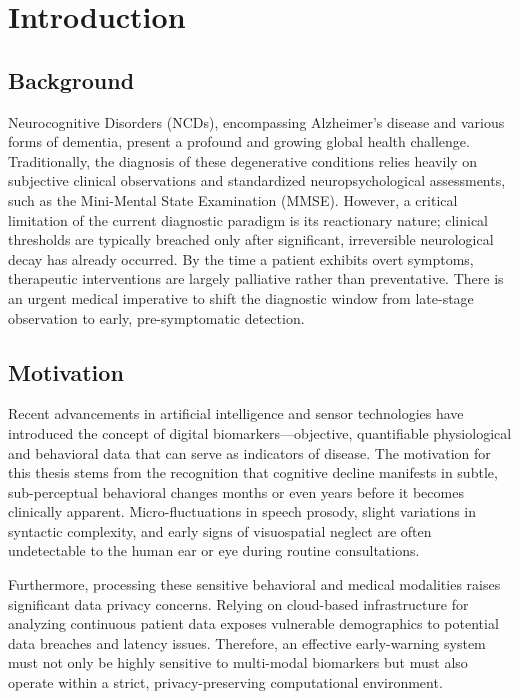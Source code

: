 \documentclass[BTech]{iitmdiss}
\begin{document}
\chapter{Introduction}
\label{chap:intro}

\section{Background}
Neurocognitive Disorders (NCDs), encompassing Alzheimer's disease and various forms of dementia, present a profound and growing global health challenge. Traditionally, the diagnosis of these degenerative conditions relies heavily on subjective clinical observations and standardized neuropsychological assessments, such as the Mini-Mental State Examination (MMSE). However, a critical limitation of the current diagnostic paradigm is its reactionary nature; clinical thresholds are typically breached only after significant, irreversible neurological decay has already occurred. By the time a patient exhibits overt symptoms, therapeutic interventions are largely palliative rather than preventative. There is an urgent medical imperative to shift the diagnostic window from late-stage observation to early, pre-symptomatic detection.

\section{Motivation}
Recent advancements in artificial intelligence and sensor technologies have introduced the concept of digital biomarkers—objective, quantifiable physiological and behavioral data that can serve as indicators of disease. The motivation for this thesis stems from the recognition that cognitive decline manifests in subtle, sub-perceptual behavioral changes months or even years before it becomes clinically apparent. Micro-fluctuations in speech prosody, slight variations in syntactic complexity, and early signs of visuospatial neglect are often undetectable to the human ear or eye during routine consultations. 

Furthermore, processing these sensitive behavioral and medical modalities raises significant data privacy concerns. Relying on cloud-based infrastructure for analyzing continuous patient data exposes vulnerable demographics to potential data breaches and latency issues. Therefore, an effective early-warning system must not only be highly sensitive to multi-modal biomarkers but must also operate within a strict, privacy-preserving computational environment.
\end{document}
